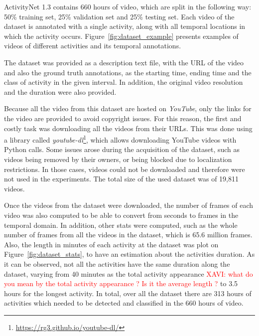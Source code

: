 ActivityNet 1.3 contains 660 hours of video, which are split in the following way: 50\% training set, 25\% validation set and 25\% testing set. Each video of the dataset is annotated with a single activity, along with all temporal locations in which the activity occurs. Figure~\ref{fig:dataset_example} presents examples of videos of different activities and its temporal annotations.

The dataset was provided as a description text file, with the URL of the video and also the ground truth annotations, as the starting time, ending time and the class of activity in the  given interval. In addition, the original video resolution and the duration were also provided.

Because all the video from this dataset are hosted on \textit{YouTube}, only the links for the video are provided to avoid copyright issues. For this reason, the first and costly task was downloading all the videos from their URLs. This was done using a library called \textit{youtube-dl}\footnote{\url{https://rg3.github.io/youtube-dl/}}, which allows downloading YouTube videos with Python calls. Some issues arose during the acquisition of the dataset, such as videos being removed by their owners, or being blocked due to localization restrictions. In those cases, videos could not be downloaded and therefore were not used in the experiments. The total size of the used dataset was of 19,811 videos.


Once the videos from the dataset were downloaded, the number of frames of each video was also computed to be able to convert from seconds to frames in the temporal domain. 
In addition, other stats were computed, such as the whole number of frames from all the videos in the dataset, which is 65.6 million frames. Also, the length in minutes of each activity at the dataset was plot on Figure~\ref{fig:dataset_stats}, to have an estimation about the activities duration. As it can be observed, not all the activities have the same duration along the dataset, varying from 40 minutes as the total activity appearance \textcolor{red}{XAVI: what do you mean by the total activity appearance ? Is it the average length ?} to 3.5 hours for the longest activity. In total, over all the dataset there are 313 hours of activities which needed to be detected and classified in the 660 hours of video.

